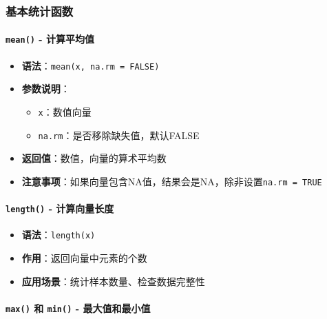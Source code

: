 \documentclass[
]{book}
\providecommand{\tightlist}{%
  \setlength{\itemsep}{0pt}\setlength{\parskip}{0pt}}
\begin{document}
\hypertarget{ux57faux672cux7edfux8ba1ux51fdux6570}{%
\subsubsection{基本统计函数}\label{ux57faux672cux7edfux8ba1ux51fdux6570}}

\hypertarget{mean---ux8ba1ux7b97ux5e73ux5747ux503c}{%
\paragraph{\texorpdfstring{\texttt{mean()} - 计算平均值}{mean() - 计算平均值}}\label{mean---ux8ba1ux7b97ux5e73ux5747ux503c}}

\begin{itemize}
\tightlist
\item
  \textbf{语法}：\texttt{mean(x,\ na.rm\ =\ FALSE)}
\item
  \textbf{参数说明}：

  \begin{itemize}
  \tightlist
  \item
    \texttt{x}：数值向量
  \item
    \texttt{na.rm}：是否移除缺失值，默认FALSE
  \end{itemize}
\item
  \textbf{返回值}：数值，向量的算术平均数
\item
  \textbf{注意事项}：如果向量包含NA值，结果会是NA，除非设置\texttt{na.rm\ =\ TRUE}
\end{itemize}

\hypertarget{length---ux8ba1ux7b97ux5411ux91cfux957fux5ea6}{%
\paragraph{\texorpdfstring{\texttt{length()} - 计算向量长度}{length() - 计算向量长度}}\label{length---ux8ba1ux7b97ux5411ux91cfux957fux5ea6}}

\begin{itemize}
\tightlist
\item
  \textbf{语法}：\texttt{length(x)}
\item
  \textbf{作用}：返回向量中元素的个数
\item
  \textbf{应用场景}：统计样本数量、检查数据完整性
\end{itemize}

\hypertarget{max-ux548c-min---ux6700ux5927ux503cux548cux6700ux5c0fux503c}{%
\paragraph{\texorpdfstring{\texttt{max()} 和 \texttt{min()} - 最大值和最小值}{max() 和 min() - 最大值和最小值}}\label{max-ux548c-min---ux6700ux5927ux503cux548cux6700ux5c0fux503c}}
\end{document}
